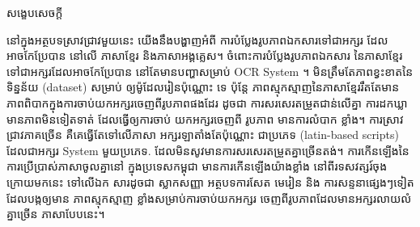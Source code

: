 \begin{adjustwidth}{0.2cm}{0.2cm}

    \begin{center}
        {\khmerfont\fontsize{15pt}{25pt}\selectfont សង្ខេបសេចក្ដី \par}
    \end{center}
    \label{khmer-abstract}
    \vspace{0.5cm}
    \khmernormal
    \small
    នៅក្នុងអត្ថបទស្រាវជ្រាវមួយនេះ យើងនឹងបង្ហាញអំពី ការបំប្លែងរូបភាពឯកសារទៅជាអក្សរ 
    ដែលអាចកែប្រែបាន នៅលើ ភាសាខ្មែរ និងភាសាអង្គគ្លេស។ ចំពោះការបំប្លែងរូបភាពឯកសារ 
    នៃភាសាខ្មែរ ទៅជាអក្សរដែលអាចកែប្រែបាន នៅតែមានបញ្ហាសម្រាប់ OCR System ។ 
    មិនត្រឹមតែភាពខ្វះខាតនៃ ទិន្នន័យ {\englishfont\fontsize{13.5pt}{20pt}\selectfont (dataset)} សម្រាប់ ឲ្យម៉ូដែលរៀនប៉ុណ្ណោះ ទេ ប៉ុន្តែ 
    ភាពស្មុកស្មាញនៃភាសាខ្មែររឹតតែមានភាពពិបាកក្នុងការចាប់យកអក្សរចេញពីរូបភាពផងដែរ 
    ដូចជា ការសរសេរតម្រួតជាន់លើគ្នា ការដកឃ្លាមានភាពមិនទៀតទាត់ ដែលធ្វើឲ្យការចាប់ 
    យកអក្សរចេញពី រូបភាព មានការលំបាក ខ្លាំង។ ការស្រាវជ្រាវភាគច្រើន គឺគេធ្វើតែទៅលើភាសា 
    អក្សរឡាតាំងតែប៉ុណ្ណោះ ជាប្រភេទ {\englishfont\fontsize{13.5pt}{20pt}\selectfont (latin-based scripts)}  ដែលជាអក្សរ System មួយប្រភេទ. 
    ដែលមិនសូវមានការសរសេរតម្រួតគ្នាច្រើនតង់។ ការកើនឡើងនៃការប្រើប្រាស់ភាសាចូលគ្នានៅ
    ក្នុងប្រទេសកម្ពុជា មានការកើនឡើងយ៉ាងខ្លាំង នៅពីរទសវត្សរ៍ចុងក្រោយមកនេះ ទៅលើឯក
    សារដូចជា ស្លាកសញ្ញា អត្ថបទការសែត មេរៀន និង ការសន្ទនាផ្សេងៗទៀតដែលបង្កឲ្យមាន
    ភាពស្មុកស្មាញ ខ្លាំងសម្រាប់ការចាប់យកអក្សរ ចេញពីរូបភាពដែលមានអក្សរលាយលំគ្នាច្រើន
    ភាសាបែបនេះ។


\end{adjustwidth}
